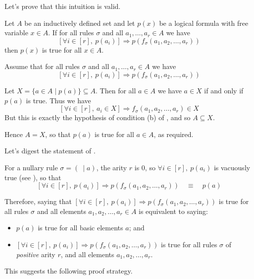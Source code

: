 Let's prove that this intuition is valid.

\begin{theorem}
\label{thmStructuralInduction}
Let $A$ be an inductively defined set and let $p(x)$ be a logical formula with free variable $x \in A$. If for all rules $\sigma$ and all $a_1,\dots,a_r \in A$ we have
\[ [\forall i \in [r],~ p(a_i)] \Rightarrow p(f_{\sigma}(a_1,a_2,\dots,a_r)) \]
then $p(x)$ is true for all $x \in A$.
\end{theorem}

\begin{cproof}
Assume that for all rules $\sigma$ and all $a_1,\dots,a_r \in A$ we have
\[ [\forall i \in [r],~ p(a_i)] \Rightarrow p(f_{\sigma}(a_1,a_2,\dots,a_r)) \]

Let $X = \{ a \in A \mid p(a) \} \subseteq A$. Then for all $a \in A$ we have $a \in X$ if and only if $p(a)$ is true. Thus we have
\[ [\forall i \in [r],~ a_i \in X] \Rightarrow f_{\sigma}(a_1,a_2,\dots,a_r) \in X \]
But this is exactly the hypothesis of condition (b) of , and so $A \subseteq X$.

Hence $A = X$, so that $p(a)$ is true for all $a \in A$, as required.
\end{cproof}

Let's digest the statement of .

For a nullary rule $\sigma = (~ \mid a)$, the arity $r$ is $0$, so $\forall i \in [r],~p(a_i)$ is vacuously true (see ), so that
\[ [\forall i \in [r],~ p(a_i)] \Rightarrow p(f_{\sigma}(a_1,a_2,\dots,a_r)) \quad \equiv \quad p(a) \]

Therefore, saying that $[\forall i \in [r],~ p(a_i)] \Rightarrow p(f_{\sigma}(a_1,a_2,\dots,a_r))$ is true for all rules $\sigma$ and all elements $a_1,a_2,\dots,a_r \in A$ is equivalent to saying:
\begin{itemize}
\item $p(a)$ is true for all basic elements $a$; and
\item $[\forall i \in [r],~ p(a_i)] \Rightarrow p(f_{\sigma}(a_1,a_2,\dots,a_r))$ is true for all rules $\sigma$ of \textit{positive} arity $r$, and all elements $a_1,a_2,\dots,a_r$.
\end{itemize}

This suggests the following proof strategy.

